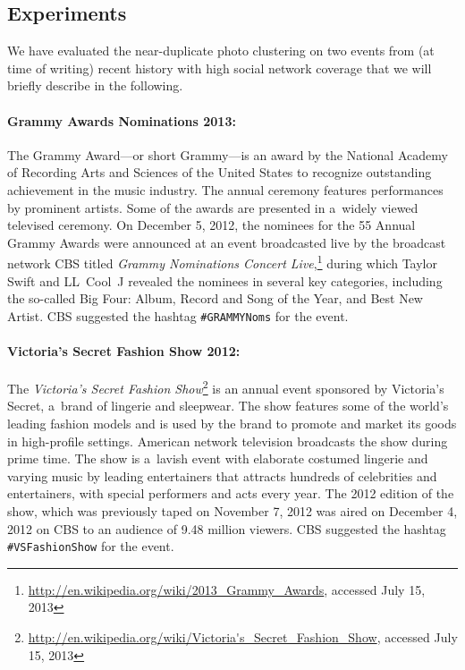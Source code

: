 \subsection{Experiments}

We have evaluated the near-duplicate photo clustering
on two events from (at time of writing) recent history with high social network coverage
that we will briefly describe in the following.

\paragraph{Grammy Awards Nominations 2013:}

The Grammy Award---or short Grammy---is an award by
the National Academy of Recording Arts and Sciences of the United States
to recognize outstanding achievement in the music industry.
The annual ceremony features performances by prominent artists.
Some of the awards are presented in a~widely viewed televised ceremony.
On December 5, 2012, the nominees for the 55 Annual Grammy Awards
were announced at an event broadcasted live by the broadcast network CBS
titled \emph{Grammy Nominations Concert
Live},\footnote{\url{http://en.wikipedia.org/wiki/2013_Grammy_Awards},
accessed July 15, 2013}
during which Taylor Swift and LL~Cool~J revealed the nominees
in several key categories, including the so-called Big Four:
Album, Record and Song of the Year, and Best New Artist.
CBS suggested the hashtag \texttt{\#GRAMMYNoms} for the event.

\paragraph{Victoria's Secret Fashion Show 2012:}
\label{sec:vsfashionshow}

The \emph{Victoria's Secret Fashion
Show}\footnote{\url{http://en.wikipedia.org/wiki/Victoria's_Secret_Fashion_Show},
accessed July 15, 2013} is an annual event
sponsored by Victoria's Secret, a~brand of lingerie and sleepwear.
The show features some of the world's leading fashion models
and is used by the brand to promote and market its goods in high-profile settings.
American network television broadcasts the show during prime time.
The show is a~lavish event with elaborate costumed lingerie and
varying music by leading entertainers
that attracts hundreds of celebrities and entertainers,
with special performers and acts every year.
The 2012 edition of the show,
which was previously taped on November 7, 2012
was aired on December 4, 2012 on CBS
to an audience of 9.48 million viewers.
CBS suggested the hashtag \texttt{\#VSFashionShow} for the event.

